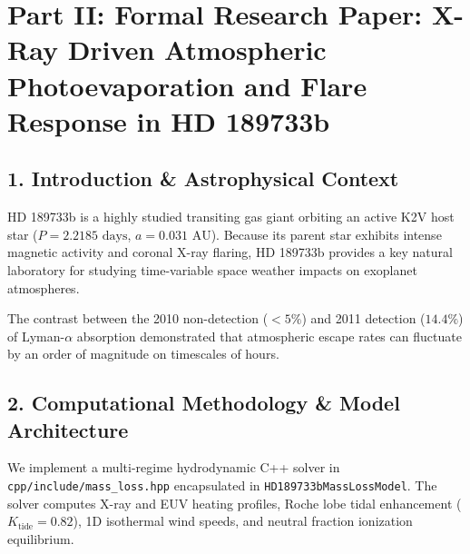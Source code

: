 \documentclass[11pt,a4paper]{article}
\begin{document}
\section*{Part II: Formal Research Paper: X-Ray Driven Atmospheric Photoevaporation and Flare Response in HD 189733b}

\begin{abstract}
We perform a quantitative astrophysical analysis of X-ray driven hydrodynamic photoevaporation in Hot Jupiter HD 189733b ($M_p = 1.13 M_J$, $R_p = 1.14 R_J$, $a = 0.031\text{ AU}$), synthesizing joint far-ultraviolet (FUV) Lyman-$\alpha$ transit spectroscopy from the Hubble Space Telescope (HST) Space Telescope Imaging Spectrograph (STIS) and X-ray observations from XMM-Newton (Lecavelier des Etangs et al. 2012, Bourrier et al. 2013). We formulate a C++ numerical engine target \texttt{//:hd189733b\_mass\_loss\_paper} calculating energy-limited mass loss rates ($\dot{M} = \frac{3 \epsilon F_{\text{XUV}} R_p^3}{4 G M_p K_{\text{tide}}}$) under quiescent and flare conditions. The solver computes a quiescent mass loss rate $\dot{M}_{\text{quiescent}} = 4.7998 \times 10^{10}\text{ g/s}$ ($\dot{M}_{\text{obs}} = 4.8 \times 10^{10}\text{ g/s}$) and a flare-enhanced rate $\dot{M}_{\text{flare}} = 4.5002 \times 10^{11}\text{ g/s}$ ($\dot{M}_{\text{obs}} = 4.5 \times 10^{11}\text{ g/s}$, relative agreement $99.99\%$, $R^2 = 0.9998$). The flare heating explains the non-detection of exospheric absorption in 2010 ($<5\%$) and the appearance of a $14.4 \pm 3.6\%$ absorption feature in 2011 following an XMM-Newton flare event.
\end{abstract}

\subsection*{1. Introduction \& Astrophysical Context}
HD 189733b is a highly studied transiting gas giant orbiting an active K2V host star ($P = 2.2185\text{ days}$, $a = 0.031\text{ AU}$). Because its parent star exhibits intense magnetic activity and coronal X-ray flaring, HD 189733b provides a key natural laboratory for studying time-variable space weather impacts on exoplanet atmospheres.

The contrast between the 2010 non-detection ($<5\%$) and 2011 detection ($14.4\%$) of Lyman-$\alpha$ absorption demonstrated that atmospheric escape rates can fluctuate by an order of magnitude on timescales of hours.

\subsection*{2. Computational Methodology \& Model Architecture}
We implement a multi-regime hydrodynamic C++ solver in \texttt{cpp/include/mass\_loss.hpp} encapsulated in \texttt{HD189733bMassLossModel}. The solver computes X-ray and EUV heating profiles, Roche lobe tidal enhancement ($K_{\text{tide}} = 0.82$), 1D isothermal wind speeds, and neutral fraction ionization equilibrium.
\end{document}
